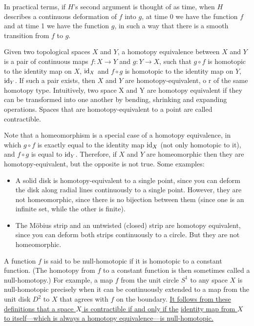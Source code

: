 In practical terms, if $H$'s second argument is thought of as time, when $H$ describes a continuous deformation of $f$ into $g$, at time 0 we have the function $f$ and at time 1 we have the function $g$, in such a way that there is a smooth transition from $f$ to $g$. \medbreak

Given two topological spaces $X$ and $Y$, a homotopy equivalence between $X$ and $Y$ is a pair of continuous maps $f: X \to Y$ and $g: Y \to X$, such that $ g \circ f $ is homotopic to the identity map on $X$, $\textnormal{id}_X$ and $ f \circ g $ is homotopic to the identity map on $Y$, $\textnormal{id}_Y$. If such a pair exists, then $X$ and $Y$ are homotopy-equivalent, o r of the same homotopy type. Intuitively, two space X and Y are homotopy equivalent if they can be transformed into one another by bending, shrinking and expanding operations. Spaces that are homotopy-equivalent to a point are called contractible.

Note that a homeomorphism is a special case of a homotopy equivalence, in which $g \circ f$ is exactly equal to the identity map $\textnormal{id}_X$ (not only homotopic to it), and $f \circ g$ is equal to $\textnormal{id}_Y$. Therefore, if $X$ and $Y$ are homeomorphic then they are homotopy-equivalent, but the opposite is not true. Some examples:

\begin{itemize}
    \item A solid disk is homotopy-equivalent to a single point, since you can deform the disk along radial lines continuously to a single point. However, they are not homeomorphic, since there is no bijection between them (since one is an infinite set, while the other is finite).
    \item The Möbius strip and an untwisted (closed) strip are homotopy equivalent, since you can deform both strips continuously to a circle. But they are not homeomorphic. \\
\end{itemize}

A function $f$ is said to be null-homotopic if it is homotopic to a constant function. (The homotopy from $f$ to a constant function is then sometimes called a null-homotopy.) For example, a map $f$ from the unit circle $S^1$ to any space $X$ is null-homotopic precisely when it can be continuously extended to a map from the unit disk $D^2$ to $X$ that agrees with $f$ on the boundary. \underline{It follows from these definitions that a space $X$ is contractible if and only if the}
\underline{ identity map from $X$ to itself—which is always a homotopy equivalence—is null-homotopic.} \\

